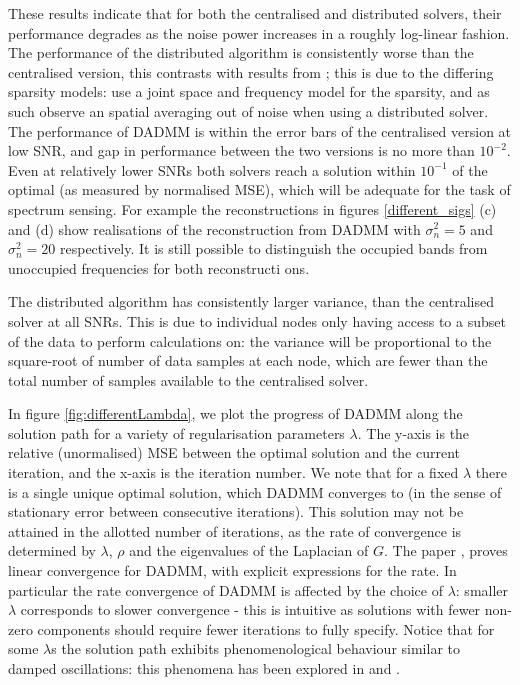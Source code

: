 \documentclass[conference]{IEEEtran}
\begin{document}
These results indicate that for both the centralised and distributed solvers, their performance degrades as the noise power increases in a roughly log-linear fashion. The performance of the distributed algorithm is consistently worse than the centralised version, this contrasts with results from \cite{bazerque2008}; this is due to the differing sparsity models: \cite{bazerque2008} use a joint space and frequency model for the sparsity, and as such observe an spatial averaging out of noise when using a distributed solver. The performance of DADMM is within the error bars of the centralised version at low SNR, and gap in performance between the two versions is no more than \(10^{-2}\). Even at relatively lower SNRs both solvers reach a solution within \(10^{-1}\) of the optimal (as measured by normalised MSE), which will be adequate for the task of spectrum sensing. For example the reconstructions in figures \eqref{different_sigs} (c) and (d) show realisations of the reconstruction from DADMM with \(\sigma^2_n = 5\) and \(\sigma^2_n = 20\) respectively. It is still possible to distinguish the occupied bands from unoccupied frequencies for both reconstructi	ons.

The distributed algorithm has consistently larger variance, than the centralised solver at all SNRs. This is due to individual nodes only having access to a subset of the data to perform calculations on: the variance will be proportional to the square-root of number of data samples at each node, which are fewer than the total number of samples available to the centralised solver. 

In figure \eqref{fig:differentLambda}, we plot the progress of DADMM along the solution path for a variety of regularisation parameters \(\lambda\). The y-axis is the relative (unormalised) MSE between the optimal solution and the current iteration, and the x-axis is the iteration number. We note that for a fixed \(\lambda\) there is a single unique optimal solution, which DADMM converges to (in the sense of stationary error between consecutive iterations). This solution may not be attained in the allotted number of iterations, as the rate of convergence is determined by \(\lambda\), \(\rho\) and the eigenvalues of the Laplacian of \(G\). The paper \cite{DADMMconvergence}, proves linear convergence for DADMM, with explicit expressions for the rate. In particular the rate convergence of DADMM is affected by the choice of \(\lambda\): smaller \(\lambda\) corresponds to slower convergence - this is intuitive as solutions with fewer non-zero components should require fewer iterations to fully specify. Notice that for some \(\lambda\)s the solution path exhibits phenomenological  behaviour similar to damped oscillations: this phenomena has been explored in \cite{nishihara2015general} and \cite{su2014differential}.  
\end{document}
